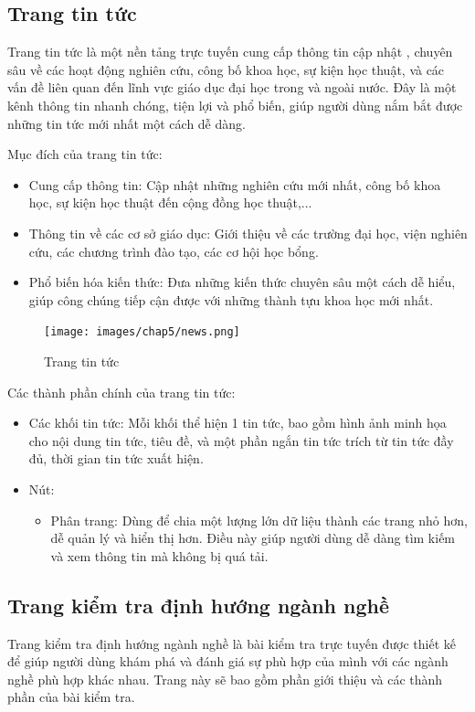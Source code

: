 \subsection{Trang tin tức}
Trang tin tức là một nền tảng trực tuyến cung cấp thông tin cập nhật , chuyên sâu về các hoạt động nghiên cứu, công bố khoa học, sự kiện học thuật, và các vấn đề liên quan đến lĩnh vực giáo dục đại học trong và ngoài nước. Đây là một kênh thông tin nhanh chóng, tiện lợi và phổ biến, giúp người dùng nắm bắt được những tin tức mới nhất một cách dễ dàng.

Mục đích của trang tin tức:
\begin{itemize}
    \item Cung cấp thông tin: Cập nhật những nghiên cứu mới nhất, công bố khoa học, sự kiện học thuật đến cộng đồng học thuật,...
    \item Thông tin về các cơ sở giáo dục: Giới thiệu về các trường đại học, viện nghiên cứu, các chương trình đào tạo, các cơ hội học bổng.
    \item Phổ biến hóa kiến thức: Đưa những kiến thức chuyên sâu một cách dễ hiểu, giúp công chúng tiếp cận được với những thành tựu khoa học mới nhất.
\end{itemize}

\begin{figure}[H]
    \centering
    \texttt{[image: images/chap5/news.png]}
    \vspace{0.5cm}
    \caption{Trang tin tức}
\end{figure}

Các thành phần chính của trang tin tức:
\begin{itemize}
    \item Các khối tin tức: Mỗi khối thể hiện 1 tin tức, bao gồm hình ảnh minh họa cho nội dung tin tức, tiêu đề, và một phần ngắn tin tức trích từ tin tức đầy đủ, thời gian tin tức xuất hiện.
    \item Nút:
        \begin{itemize}
            \item Phân trang: Dùng để chia một lượng lớn dữ liệu thành các trang nhỏ hơn, dễ quản lý và hiển thị hơn. Điều này giúp người dùng dễ dàng tìm kiếm và xem thông tin mà không bị quá tải.
        \end{itemize}
\end{itemize}


\subsection{Trang kiểm tra định hướng ngành nghề}
Trang kiểm tra định hướng ngành nghề là bài kiểm tra trực tuyến được thiết kế để giúp người dùng khám phá và đánh giá sự phù hợp của mình với các ngành nghề phù hợp khác nhau. Trang này sẽ bao gồm phần giới thiệu và các thành phần của bài kiểm tra.

